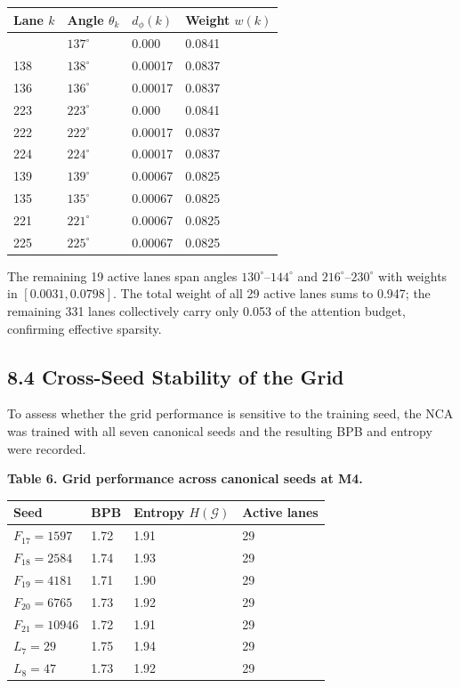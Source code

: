 \begin{longtable}[]{@{}llll@{}}
\toprule\noalign{}
Lane \(k\) & Angle \(\theta_k\) & \(d_\phi(k)\) &
Weight \(w(k)\) \\
\midrule\noalign{}
\endhead
\bottomrule\noalign{}
\endlastfoot
137 & \(137^\circ\) & 0.000 & 0.0841 \\
138 & \(138^\circ\) & 0.00017 & 0.0837 \\
136 & \(136^\circ\) & 0.00017 & 0.0837 \\
223 & \(223^\circ\) & 0.000 & 0.0841 \\
222 & \(222^\circ\) & 0.00017 & 0.0837 \\
224 & \(224^\circ\) & 0.00017 & 0.0837 \\
139 & \(139^\circ\) & 0.00067 & 0.0825 \\
135 & \(135^\circ\) & 0.00067 & 0.0825 \\
221 & \(221^\circ\) & 0.00067 & 0.0825 \\
225 & \(225^\circ\) & 0.00067 & 0.0825 \\
\end{longtable}

The remaining 19 active lanes span angles
\(130^\circ\)--\(144^\circ\) and
\(216^\circ\)--\(230^\circ\) with weights in
\([0.0031, 0.0798]\). The total weight of all 29
active lanes sums to 0.947; the remaining 331 lanes
collectively carry only 0.053 of the attention
budget, confirming effective sparsity.

\subsection{8.4 Cross-Seed Stability of the
Grid}\label{fa_16:cross-seed-stability}

To assess whether the grid performance is sensitive
to the training seed, the NCA was trained with all
seven canonical seeds and the resulting BPB and
entropy were recorded.

\textbf{Table 6. Grid performance across canonical
seeds at M4.}

\begin{longtable}[]{@{}llll@{}}
\toprule\noalign{}
Seed & BPB & Entropy \(H(\mathcal{G})\) & Active lanes \\
\midrule\noalign{}
\endhead
\bottomrule\noalign{}
\endlastfoot
\(F_{17}=1597\) & 1.72 & 1.91 & 29 \\
\(F_{18}=2584\) & 1.74 & 1.93 & 29 \\
\(F_{19}=4181\) & 1.71 & 1.90 & 29 \\
\(F_{20}=6765\) & 1.73 & 1.92 & 29 \\
\(F_{21}=10946\) & 1.72 & 1.91 & 29 \\
\(L_7=29\) & 1.75 & 1.94 & 29 \\
\(L_8=47\) & 1.73 & 1.92 & 29 \\
\end{longtable}

